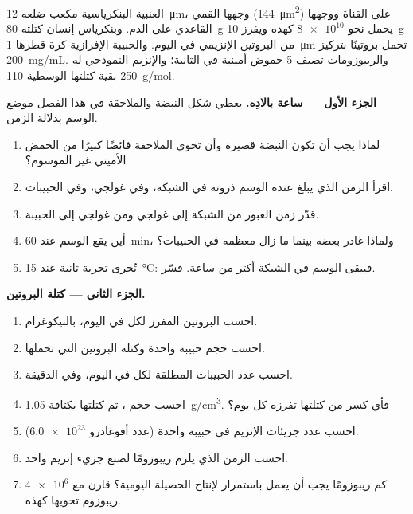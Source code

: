 \begin{problem}
\label{pb:b1:eukaryotic-cell:1}
 العنبية البنكرياسية مكعب ضلعه \qty{12}{\micro m}، وجهها القمي
(\qty{144}{\micro m^2}) على القناة ووجهها القاعدي على الدم. وبنكرياس
إنسان كتلته \qty{80}{g} يحمل نحو $\num{8e10}$  كهذه ويفرز
\qty{10}{g} من البروتين الإنزيمي في اليوم. والحبيبة الإفرازية كرة
قطرها \qty{1}{\micro m} تحمل بروتينًا بتركيز \qty{200}{mg/mL}.
والريبوزومات تضيف \qty{5}{} حموض أمينية في الثانية؛ والإنزيم النموذجي
له \qty{250}{} بقية كتلتها الوسطية \qty{110}{g/mol}.

\medskip
\noindent\textbf{الجزء الأول --- ساعة بالادِه.}
يعطي شكل النبضة والملاحقة في هذا الفصل موضع الوسم بدلالة الزمن.
\begin{enumerate}
  \item لماذا يجب أن تكون النبضة قصيرة وأن تحوي الملاحقة فائضًا
        كبيرًا من الحمض الأميني غير الموسوم؟
  \item اقرأ الزمن الذي يبلغ عنده الوسم ذروته في الشبكة، وفي غولجي،
        وفي الحبيبات.
  \item قدّر زمن العبور من الشبكة إلى غولجي ومن غولجي إلى الحبيبة.
  \item أين يقع الوسم عند \qty{60}{min}، ولماذا غادر بعضه 
        بينما ما زال معظمه في الحبيبات؟
  \item تُجرى تجربة ثانية عند \qty{15}{\celsius}: فيبقى الوسم في
        الشبكة أكثر من ساعة. فسّر.
\end{enumerate}

\medskip
\noindent\textbf{الجزء الثاني --- كتلة البروتين.}
\begin{enumerate}[resume]
  \item احسب البروتين المفرز لكل  في اليوم، بالبيكوغرام.
  \item احسب حجم حبيبة واحدة وكتلة البروتين التي تحملها.
  \item احسب عدد الحبيبات المطلقة لكل  في اليوم، وفي الدقيقة.
  \item احسب حجم ، ثم كتلتها بكثافة \qty{1.05}{g/cm^3}. فأي
        كسر من كتلتها تفرزه كل يوم؟
  \item احسب عدد جزيئات الإنزيم في حبيبة واحدة (عدد أفوغادرو
        $\num{6.0e23}$).
  \item احسب الزمن الذي يلزم ريبوزومًا لصنع جزيء إنزيم واحد.
  \item كم ريبوزومًا يجب أن يعمل باستمرار لإنتاج الحصيلة اليومية؟
        قارن مع $\num{4e6}$ ريبوزوم تحويها  كهذه.
\end{enumerate}


\end{problem}
